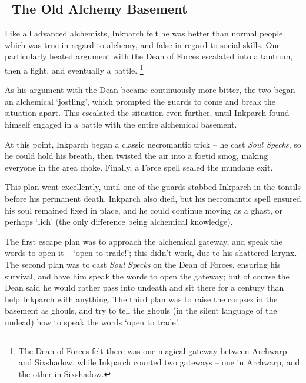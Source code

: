 \subsection[The Old Alchemy Basement]{~The Old Alchemy Basement~}
\label{old_alchemy_basement}


\begin{exampletext}
  \noindent
  Like all advanced alchemists, Inkparch felt he was better than normal people, which was true in regard to alchemy, and false in regard to social skills.
  One particularly heated argument with the Dean of Forces escalated into a tantrum, then a fight, and eventually a battle.%
  \footnote{The Dean of Forces felt there was one magical gateway between Archwarp and Sixshadow, while Inkparch counted two gateways -- one in Archwarp, and the other in Sixshadow.}

  As his argument with the Dean became continuously more bitter, the two began an alchemical `jostling', which prompted the guards to come and break the situation apart.
  This escalated the situation even further, until Inkparch found himself engaged in a battle with the entire alchemical basement.

  At this point, Inkparch began a classic necromantic trick -- he cast \textit{Soul Specks}, so he could hold his breath, then twisted the air into a foetid smog, making everyone in the area choke.
  Finally, a Force \gls{spell} sealed the mundane exit.

  This plan went excellently, until one of the guards stabbed Inkparch in the tonsils before his permanent death.
  Inkparch also died, but his necromantic \gls{spell} ensured his soul remained fixed in place, and he could continue moving as a ghast, or perhaps `lich' (the only difference being alchemical knowledge).

  The first escape plan was to approach the alchemical gateway, and speak the words to open it -- `open to trade!'; this didn't work, due to his shattered larynx.
  The second plan was to cast \textit{Soul Specks} on the Dean of Forces, ensuring his survival, and have him speak the words to open the gateway; but of course the Dean said he would rather pass into undeath and sit there for a century than help Inkparch with anything.
  The third plan was to raise the corpses in the basement as ghouls, and try to tell the ghouls (in the silent language of the undead) how to speak the words `open to trade'.


\end{exampletext}
